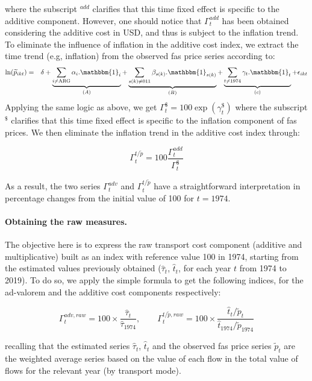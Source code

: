 \documentclass[a4paper,11pt]{article}
\begin{document}
\noindent where the subscript $^{add}$ clarifies that this time fixed effect is specific to the additive component. However, one should notice that $\Gamma^{add}_t$ has been obtained considering the additive cost in USD, and thus is subject to the inflation trend. To eliminate the influence of inflation in the additive cost index, we extract the time trend (e.g, inflation) from the observed fas price series according to:
\begin{eqnarray}
\ln(\widetilde{p}_{ikt})&=&\delta +\underbrace{\sum_{i \neq \text{ARG}}\alpha_i.\mathbbm{1}_i}_{(A)} + \underbrace{\sum_{s(k)\neq \text{011}}\beta_{s(k)}.\mathbbm{1}_{s(k)}}_{(B)} + \underbrace{\sum_{t \neq 1974}\gamma_t.\mathbbm{1}_t}_{(c)}+\epsilon_{ikt} \label{eq:compeffects_pfas}
\end{eqnarray}
Applying the same logic as above, we get $\Gamma^{\$}_t = 100\exp(\gamma^{\$}_t)$ where the subscript $^{\$}$ clarifies that this time fixed effect is specific to the inflation component of fas prices. We then eliminate the inflation trend in the additive cost index through:

\begin{equation}
\Gamma^{t/\widetilde{p}}_t  = 100 \frac{\Gamma^{add}_t}{\Gamma^{\$}_t} \label{eq:tsptilde_compoeffect}
\end{equation}

As a result, the two series $\Gamma^{adv}_t$ and $\Gamma^{t/\widetilde{p}}_t$ have a straightforward interpretation in percentage changes from the initial value of 100 for $t=1974$.



\paragraph{Obtaining the raw measures.} The objective here is to express the raw transport cost component (additive and multiplicative) built as an index with reference value 100 in 1974, starting from the estimated values previously obtained ($\widehat{\tau}_t$, $\widehat{t}_t$, for each year $t$ from 1974 to 2019).
To do so, we apply the simple formula to get the following indices, for the ad-valorem and the additive cost components respectively:

$$\Gamma^{adv, raw}_t = 100\times\frac{\widehat{\tau}_t}{\widehat{\tau}_{1974}},\qquad \Gamma^{t/\widetilde{p}, raw}_t = 100\times\frac{\widehat{t}_t/\widetilde{p}_t}{\widehat{t}_{1974}/\widetilde{p}_{1974}}$$


\noindent recalling that the estimated series $\widehat{\tau}_t$, $\widehat{t}_t$ and the observed fas price series $\widetilde{p}_t$ are the weighted average series based on the value of each flow in the total value of flows for the relevant year (by transport mode).
\end{document}
